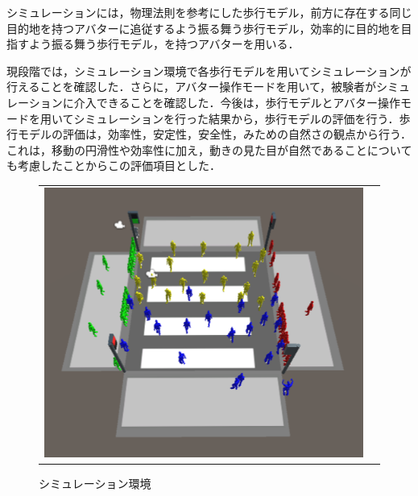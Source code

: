 \documentclass[twocolumn]{jarticle}%
\begin{document}
シミュレーションには，物理法則を参考にした歩行モデル\cite{Akuzawa}，前方に存在する同じ目的地を持つアバターに追従するよう振る舞う歩行モデル\cite{Sasagawa}，効率的に目的地を目指すよう振る舞う歩行モデル，を持つアバターを用いる．

現段階では，シミュレーション環境で各歩行モデルを用いてシミュレーションが行えることを確認した．さらに，アバター操作モードを用いて，被験者がシミュレーションに介入できることを確認した．今後は，歩行モデルとアバター操作モードを用いてシミュレーションを行った結果から，歩行モデルの評価を行う．歩行モデルの評価は，効率性\cite{Iryo-4}，安定性\cite{Iryo-4}，安全性，みための自然さ\cite{Iryo-2}の観点から行う．これは，移動の円滑性や効率性に加え，動きの見た目が自然であることについても考慮したことからこの評価項目とした．

\begin{figure}[H]
    \begin{tabular}{cc}
      \begin{minipage}[t]{0.45\hsize}
        \centering
        \includegraphics[keepaspectratio, scale=0.11]{images/environment.JPG}
        \caption{シミュレーション環境}
        \label{fig:environment}
      \end{minipage} &
      \begin{minipage}[t]{0.45\hsize}
        \centering

\end{minipage}
\end{tabular}
\end{figure}
\end{document}
